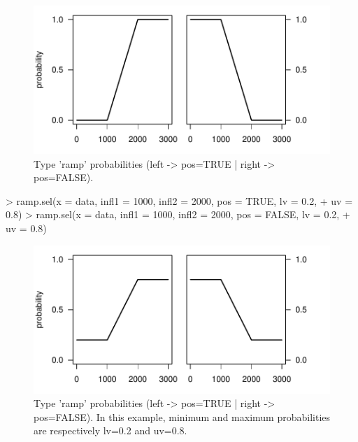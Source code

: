 \documentclass[letterpaper, 12pt]{article}
\begin{document}
\begin{figure}[h]
\vspace{-20pt}
\begin{center}
\includegraphics{relation_sel-015}
\end{center}
\vspace{-30pt}
\caption{Type 'ramp' probabilities (left -> pos=TRUE |  right -> pos=FALSE).}
\vspace{-10pt}
\label{fig7}
\end{figure}

\vspace*{\fill}
\newpage


\begin{Schunk}
\begin{Sinput}
> ramp.sel(x = data, infl1 = 1000, infl2 = 2000, pos = TRUE, lv = 0.2, 
+     uv = 0.8)
> ramp.sel(x = data, infl1 = 1000, infl2 = 2000, pos = FALSE, lv = 0.2, 
+     uv = 0.8)
\end{Sinput}
\end{Schunk}

\begin{figure}[h]
\vspace{-20pt}
\begin{center}
\includegraphics{relation_sel-017}
\end{center}
\vspace{-30pt}
\caption{Type 'ramp' probabilities (left -> pos=TRUE |  right -> pos=FALSE). In this example, minimum and maximum probabilities are respectively lv=0.2 and uv=0.8.}
\vspace{-10pt}
\label{fig8}
\end{figure}
\end{document}
